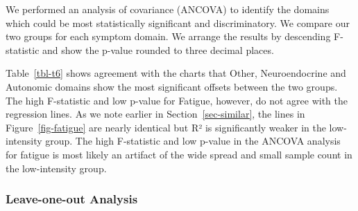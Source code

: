 \documentclass[
  letterpaper,
  DIV=11,
  numbers=noendperiod]{scrartcl}
\begin{document}
We performed an analysis of covariance (ANCOVA) to identify the domains
which could be most statistically significant and discriminatory. We
compare our two groups for each symptom domain. We arrange the results
by descending F-statistic and show the p-value rounded to three decimal
places.

\FloatBarrier

\begin{table}[h]

\caption{\label{tbl-t6}ANCOVA Analysis}


\end{table}%

Table~\ref{tbl-t6} shows agreement with the charts that Other,
Neuroendocrine and Autonomic domains show the most significant offsets
between the two groups. The high F-statistic and low p-value for
Fatigue, however, do not agree with the regression lines. As we note
earlier in Section~\ref{sec-similar}, the lines in
Figure~\ref{fig-fatigue} are nearly identical but R² is significantly
weaker in the low-intensity group. The high F-statistic and low p-value
in the ANCOVA analysis for fatigue is most likely an artifact of the
wide spread and small sample count in the low-intensity group.

\FloatBarrier

\subsubsection*{Leave-one-out Analysis}\label{sec-loo}
\end{document}
